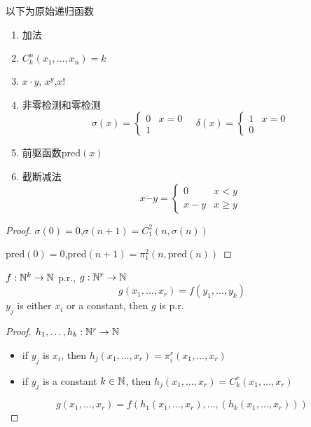 \documentclass[11pt]{article}
\def \pred {\text{pred}}
\begin{document}
\begin{lemma}[]
以下为原始递归函数
\begin{enumerate}
\item 加法
\item \(C_k^n(x_1,\dots,x_n)=k\)
\item \(x\cdot y\), \(x^y\),\(x!\)
\item 非零检测和零检测
\begin{equation*}
\sigma(x)=
\begin{cases}
0&x=0\\
1
\end{cases}\quad
\delta(x)=
\begin{cases}
1&x=0\\
0
\end{cases}
\end{equation*}
\item 前驱函数\(\pred(x)\)
\item 截断减法
\begin{equation*}
x\dot-y=
\begin{cases}
0&x<y\\
x-y&x\ge y
\end{cases}
\end{equation*}
\end{enumerate}
\end{lemma}

\begin{proof}
\(\sigma(0)=0\),\(\sigma(n+1)=C_1^2(n,\sigma(n))\)

\(\pred(0)=0\),\(\pred(n+1)=\pi_1^2(n,\pred(n))\)
\end{proof}

\begin{lemma}[]
\(f:\mathbb{N}^k\to\mathbb{N}\) p.r., \(g:\mathbb{N}^r\to\mathbb{N}\)
\begin{equation*}
g(x_1,\dots,x_r)=f(y_1,\dots,y_k)
\end{equation*}
\(y_j\) is either \(x_i\) or a constant, then \(g\) is p.r.
\end{lemma}

\begin{proof}
\(h_1,\dots,h_k:\mathbb{N}^r\to\mathbb{N}\)
\begin{itemize}
\item if \(y_j\) is \(x_i\), then \(h_j(x_1,\dots,x_r)=\pi_i^r(x_1,\dots,x_r)\)
\item if \(y_j\) is a constant \(k\in\mathbb{N}\), then \(h_j(x_1,\dots,x_r)=C_k^r(x_1,\dots,x_r)\)
\end{itemize}


\begin{equation*}
g(x_1,\dots,x_r)=f(h_1(x_1,\dots,x_r),\dots,(h_k(x_1,\dots,x_r)))
\end{equation*}
\end{proof}
\end{document}
